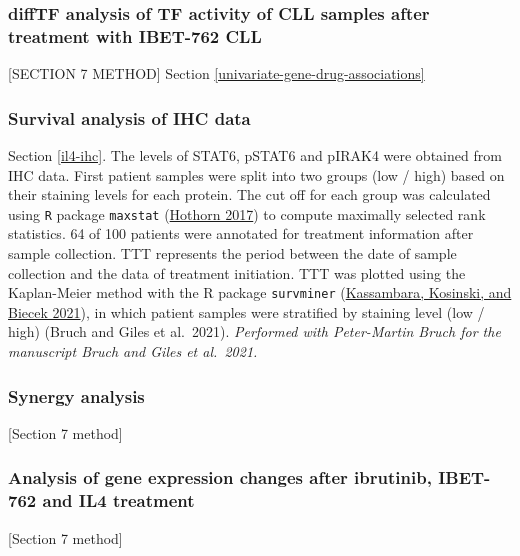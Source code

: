 \documentclass[11pt, a4paper, twosided]{book}
\begin{document}
\hypertarget{ibet-ATACseq-method}{%
\subsubsection{diffTF analysis of TF activity of CLL samples after treatment with IBET-762 CLL}\label{ibet-ATACseq-method}}

{[}SECTION 7 METHOD{]}
Section \ref{univariate-gene-drug-associations}

\hypertarget{il4-ihc-method}{%
\subsubsection{Survival analysis of IHC data}\label{il4-ihc-method}}

Section \ref{il4-ihc}. The levels of STAT6, pSTAT6 and pIRAK4 were obtained from IHC data. First patient samples were split into two groups (low / high) based on their staining levels for each protein. The cut off for each group was calculated using \texttt{R} package \texttt{maxstat} (\protect\hyperlink{ref-R-maxstat}{Hothorn 2017}) to compute maximally selected rank statistics. 64 of 100 patients were annotated for treatment information after sample collection. TTT represents the period between the date of sample collection and the data of treatment initiation. TTT was plotted using the Kaplan-Meier method with the R package \texttt{survminer} (\protect\hyperlink{ref-R-survminer}{Kassambara, Kosinski, and Biecek 2021}), in which patient samples were stratified by staining level (low / high) (Bruch and Giles et al.~2021). \emph{Performed with Peter-Martin Bruch for the manuscript Bruch and Giles et al.~2021.}

\hypertarget{synergy-analysis}{%
\subsubsection{Synergy analysis}\label{synergy-analysis}}

{[}Section 7 method{]}

\hypertarget{analysis-of-gene-expression-changes-after-ibrutinib-ibet-762-and-il4-treatment}{%
\subsubsection{Analysis of gene expression changes after ibrutinib, IBET-762 and IL4 treatment}\label{analysis-of-gene-expression-changes-after-ibrutinib-ibet-762-and-il4-treatment}}

{[}Section 7 method{]}
\end{document}
